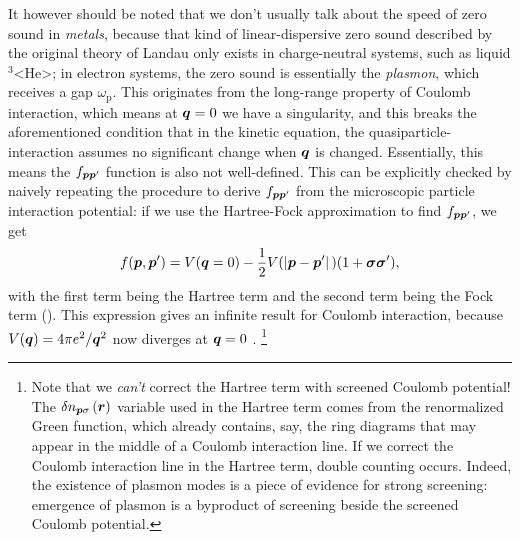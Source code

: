 \documentclass[hyperref, a4paper]{article}
\def\ce#1{<#1>}%
\begin{document}
It however should be noted that
we don't usually talk about the speed of zero sound in \emph{metals},
because that kind of linear-dispersive zero sound described 
by the original theory of Landau 
only exists in charge-neutral systems, 
such as liquid $^3$\ce{He};
in electron systems,
the zero sound is essentially the \emph{plasmon}, 
which receives a gap $\omega_{\text{p}}$.
This originates from the long-range property of Coulomb interaction,
which means at $\vb*{q} = 0$ we have a singularity, 
and this breaks the aforementioned condition 
that in the kinetic equation, 
the quasiparticle-interaction assumes no significant change when $\vb*{q}$ is changed. 
Essentially, this means the $f_{\vb*{p} \vb*{p}'}$ function is also not well-defined.
This can be explicitly checked by naively repeating the procedure 
to derive $f_{\vb*{p} \vb*{p}'}$ from the microscopic particle interaction potential:
if we use the Hartree-Fock approximation to find $f_{\vb*{p} \vb*{p}'}$, 
we get 
\begin{equation}
    f(\vb*{p}, \vb*{p}') = 
    V(\vb*{q} = 0) - \frac{1}{2} V(\abs*{\vb*{p} - \vb*{p}'}) (1 + \vb*{\sigma} \vb*{\sigma}'),
\end{equation}
with the first term being the Hartree term 
and the second term being the Fock term
().
This expression gives an infinite result for Coulomb interaction, 
because $V(\vb*{q}) = 4 \pi e^2 / \vb*{q}^2$ now diverges at $\vb*{q} = 0$ \cite{silin1958theory}.%
\footnote{
    Note that we \emph{can't} correct the Hartree term with screened Coulomb potential!
    The $\var{n}_{\vb*{p} \sigma}(\vb*{r})$ variable used in the Hartree term 
    comes from the renormalized Green function, 
    which already contains, say, the ring diagrams that may appear 
    in the middle of a Coulomb interaction line.
    If we correct the Coulomb interaction line in the Hartree term, 
    double counting occurs. 
    Indeed, the existence of plasmon modes is a piece of evidence for strong screening:
    emergence of plasmon is a byproduct of screening beside the screened Coulomb potential.
}
\end{document}
